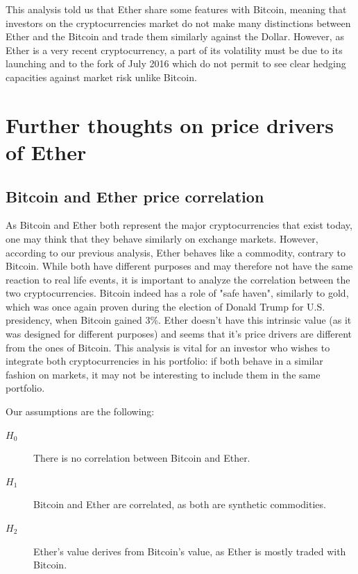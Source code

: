 \documentclass[11pt]{report}
\begin{document}
This analysis told us that Ether share some features with Bitcoin, meaning that investors on the cryptocurrencies market do not make many distinctions between Ether and the Bitcoin and trade them similarly against the Dollar. However, as Ether is a very recent cryptocurrency, a part of its volatility must be due to its launching and to the fork of July 2016 which do not permit to see clear hedging capacities against market risk unlike Bitcoin.


\chapter{Further thoughts on price drivers of Ether}
 \section{Bitcoin and Ether price correlation}
 
As Bitcoin and Ether both represent the major cryptocurrencies that exist today, one may think that they behave similarly on exchange markets. However, according to our previous analysis, Ether behaves like a commodity, contrary to Bitcoin. \newline
While both have different purposes and may therefore not have the same reaction to real life events, it is important to analyze the correlation between the two cryptocurrencies.
Bitcoin indeed has a role of "safe haven", similarly to gold, which was once again proven during the election of Donald Trump for U.S. presidency, when Bitcoin gained 3\%. Ether doesn't have this intrinsic value (as it was designed for different purposes) and seems that it's price drivers are different from the ones of Bitcoin.\newline 
This analysis is vital for an investor who wishes to integrate both cryptocurrencies in his portfolio: if both behave in a similar fashion on markets, it may not be interesting to include them in the same portfolio. \newline

Our assumptions are the following:
\begin{description}
\item[$H_0$]There is no correlation between Bitcoin and Ether.
\item[$H_1$]Bitcoin and Ether are correlated, as both are synthetic commodities.
\item[$H_2$]Ether's value derives from Bitcoin's value, as Ether is mostly traded with Bitcoin.
\end{description}
\end{document}

